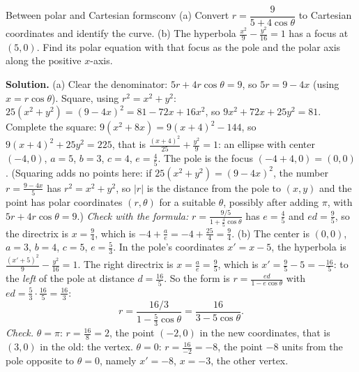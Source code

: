 \documentclass[11pt]{article}
\begin{document}
\begin{exmp}{Between polar and Cartesian forms}{conv}
(a) Convert $r=\dfrac9{5+4\cos\theta}$ to Cartesian coordinates and identify the curve. (b) The hyperbola $\frac{x^2}9-\frac{y^2}{16}=1$ has a focus at $(5,0)$. Find its polar equation with that focus as the pole and the polar axis along the positive $x$-axis.

\textbf{Solution.} (a) Clear the denominator: $5r+4r\cos\theta=9$, so $5r=9-4x$ (using $x=r\cos\theta$). Square, using $r^2=x^2+y^2$: $25\left(x^2+y^2\right)=(9-4x)^2=81-72x+16x^2$, so $9x^2+72x+25y^2=81$. Complete the square: $9\left(x^2+8x\right)=9(x+4)^2-144$, so $9(x+4)^2+25y^2=225$, that is $\frac{(x+4)^2}{25}+\frac{y^2}9=1$: an ellipse with center $(-4,0)$, $a=5$, $b=3$, $c=4$, $e=\frac45$. The pole is the focus $(-4+4,0)=(0,0)$. (Squaring adds no points here: if $25(x^2+y^2)=(9-4x)^2$, the number $r=\frac{9-4x}5$ has $r^2=x^2+y^2$, so $\lvert r\rvert$ is the distance from the pole to $(x,y)$ and the point has polar coordinates $(r,\theta)$ for a suitable $\theta$, possibly after adding $\pi$, with $5r+4r\cos\theta=9$.) \emph{Check with the formula:} $r=\frac{9/5}{1+\frac45\cos\theta}$ has $e=\frac45$ and $ed=\frac95$, so the directrix is $x=\frac94$, which is $-4+\frac ae=-4+\frac{25}4=\frac94$.
(b) The center is $(0,0)$, $a=3$, $b=4$, $c=5$, $e=\frac53$. In the pole's coordinates $x'=x-5$, the hyperbola is $\frac{(x'+5)^2}9-\frac{y^2}{16}=1$. The right directrix is $x=\frac ae=\frac95$, which is $x'=\frac95-5=-\frac{16}5$: to the \emph{left} of the pole at distance $d=\frac{16}5$. So the form is $r=\frac{ed}{1-e\cos\theta}$ with $ed=\frac53\cdot\frac{16}5=\frac{16}3$:
\[
r=\frac{16/3}{1-\frac53\cos\theta}=\frac{16}{3-5\cos\theta}.
\]
\emph{Check.} $\theta=\pi$: $r=\frac{16}8=2$, the point $(-2,0)$ in the new coordinates, that is $(3,0)$ in the old: the vertex. $\theta=0$: $r=\frac{16}{-2}=-8$, the point $-8$ units from the pole opposite to $\theta=0$, namely $x'=-8$, $x=-3$, the other vertex.
\end{exmp}
\end{document}

